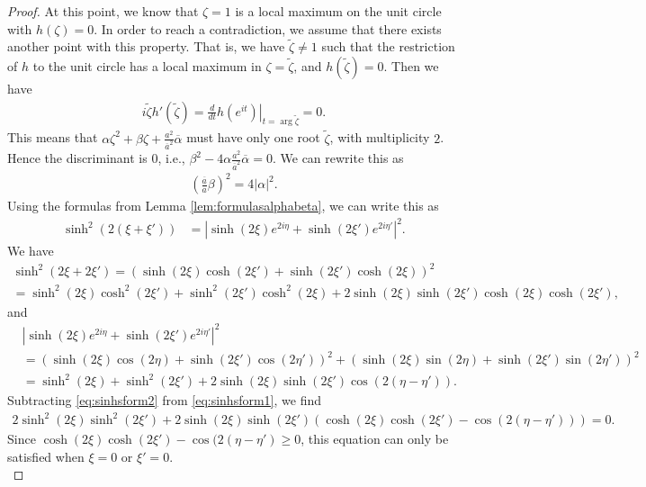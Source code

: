 \documentclass[%
 jmp,
cp,  %
 amsmath,amsthm,amssymb,%
 reprint,%
onecolumn]{revtex4-2}
\begin{document}
\begin{proof}
At this point, we know that $\zeta=1$ is a local maximum on the unit circle with $h(\zeta)=0$. In order to reach a contradiction, we assume that there exists another point with this property. That is, we have $\tilde\zeta\neq 1$ such that the restriction of $h$ to the unit circle has a local maximum in $\zeta=\tilde\zeta$, and $h(\tilde\zeta)=0$. Then we have 
\begin{align*}
i\tilde\zeta h'\left(\tilde\zeta\right) = \left. \frac{d}{dt} h\left(e^{i t}\right)\right|_{t=\arg \tilde\zeta} = 0.
\end{align*}
This means that $\alpha \zeta^2+\beta \zeta+\frac{a^2}{\overline a^2} \overline \alpha$ must have only one root $\tilde\zeta$, with multiplicity $2$. Hence the discriminant is $0$, i.e., $\beta^2 - 4 \alpha \frac{a^2}{\overline a^2} \overline \alpha = 0$. 
We can rewrite this as
\begin{align*}
\left(\frac{\overline a}{a} \beta\right)^2 = 4 |\alpha|^2.  
\end{align*}
Using the formulas from Lemma \ref{lem:formulasalphabeta}, we can write this as
\begin{align*}
\sinh^2 (2(\xi+\xi'))
&= \left|\sinh(2\xi) e^{2i\eta} + \sinh(2\xi') e^{2i\eta'}\right|^2.
\end{align*}
We have
\begin{multline} \label{eq:sinhsform1}
\sinh^2(2\xi+2\xi') = \left(\sinh(2\xi)\cosh(2\xi')+\sinh(2\xi') \cosh(2\xi)\right)^2\\
= \sinh^2(2\xi)\cosh^2(2\xi')
+\sinh^2(2\xi')\cosh^2(2\xi)
+ 2 \sinh(2\xi) \sinh(2\xi') \cosh(2\xi) \cosh(2\xi'),
\end{multline}
and 
\begin{align} \nonumber
&\left|\sinh(2\xi) e^{2i\eta} + \sinh(2\xi') e^{2i\eta'}\right|^2\\ \nonumber
&= \left(\sinh(2\xi) \cos(2\eta) + \sinh(2\xi') \cos(2\eta')\right)^2 
+ \left(\sinh(2\xi) \sin(2\eta) + \sinh(2\xi') \sin(2\eta')\right)^2\\ \label{eq:sinhsform2}
&= \sinh^2 (2\xi) + \sinh^2 (2\xi') 
+ 2\sinh(2\xi) \sinh(2\xi') \cos(2(\eta-\eta')).
\end{align}
Subtracting \eqref{eq:sinhsform2} from \eqref{eq:sinhsform1}, we find
\begin{align*}
2 \sinh^2(2\xi) \sinh^2(2\xi') + 2 \sinh(2\xi) \sinh(2\xi')  \left(\cosh(2\xi) \cosh(2\xi') - \cos(2(\eta-\eta'))\right) = 0.
\end{align*}
Since $\cosh(2\xi) \cosh(2\xi') - \cos(2(\eta-\eta')\geq 0$, this equation can only be satisfied when $\xi=0$ or $\xi'=0$.\\ 
\end{proof}
\end{document}
